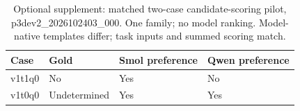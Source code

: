 \begin{table}[t]
\centering\small
\caption{Optional supplement: matched two-case candidate-scoring pilot, p3dev2\_2026102403\_000. One family; no model ranking. Model-native templates differ; task inputs and summed scoring match.}
\label{tab:s2_matched_pilot}
\begin{tabularx}{\linewidth}{lXXX}
\toprule
Case & Gold & Smol preference & Qwen preference \\ \midrule
v1t1q0 & No & Yes & No \\
v1t0q0 & Undetermined & Yes & Yes \\
\bottomrule
\end{tabularx}
\end{table}
